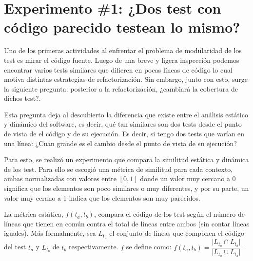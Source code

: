\chapter{Experimento \#1: ¿Dos test con código parecido testean lo mismo? }

\par Uno de los primeras actividades al enfrentar el problema de modularidad de los test es mirar el código fuente. Luego de una breve y ligera inspección podemos encontrar varios tests similares que difieren en pocas líneas de código lo cual motiva distintas estrategias de refactorización. Sin embargo, junto con esto, surge la siguiente pregunta: posterior a la refactorización, ¿cambiará la cobertura de dichos test?. 

\par Esta pregunta deja al descubierto la diferencia que existe entre el análisis estático y dinámico del software, es decir, qué tan similares son dos tests desde el punto de vista de el código y de su ejecución. Es decir, si tengo dos tests que varían en una línea: ¿Cuan grande es el cambio desde el punto de vista de su ejecución?

\par Para esto, se realizó un experimento que compara la similitud estática y dinámica de los test. Para ello se escogió una métrica de similitud para cada contexto, ambas normalizadas con valores entre $\left[ 0 , 1 \right]$ donde un valor muy cercano a $0$ significa que los elementos son poco similares o muy diferentes, y por su parte, un valor muy cerano a 1 indica que los elementos son muy parecidos. 

\par La métrica estática, $f(t_a,t_b)$, compara el código de los test según el número de líneas que tienen en común contra el total de líneas entre ambos (sin contar líneas iguales). Más formalmente, sea $L_{t_a}$ el conjunto de líneas que componen el código del test $t_a$ y  $L_{t_b}$ de $t_b$ respectivamente. $f$ se define como: $f(t_a,t_b)= \dfrac{\vert L_{t_a} \cap L_{t_b} \vert}{\vert L_{t_a} \cup L_{t_b} \vert}$.


